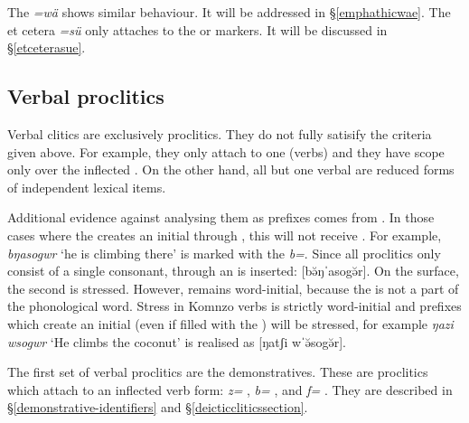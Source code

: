 The   \emph{=wä} shows similar behaviour. It will be addressed in \S{}\ref{emphathicwae}. The et cetera  \emph{=sü} only attaches to the  or   markers. It will be discussed in \S{}\ref{etceterasue}.

\subsection{Verbal proclitics}\label{verbproclitics}

Verbal clitics are exclusively proclitics. They do not fully satisify the criteria given above. For example, they only attach to one  (verbs) and they have scope only over the inflected . On the other hand, all but one verbal  are reduced forms of independent lexical items.%

Additional evidence against analysing them as prefixes comes from . In those cases where the  creates an initial  through , this  will not receive . For example, \emph{bŋasogwr} `he is climbing there' is marked with the   \emph{b=}. Since all proclitics only consist of a single consonant, through  an  is inserted: [bə̆ŋˈasogə̆r]. On the surface, the second  is stressed. However,  remains word-initial, because the  is not a part of the phonological word. Stress in Komnzo verbs is strictly word-initial and prefixes which create an initial  (even if filled with the ) will be stressed, for example \emph{ŋazi wsogwr} `He climbs the coconut' is realised as [ŋatʃi wˈə̆sogə̆r].%

The first set of verbal proclitics are the  demonstratives. These are  proclitics which attach to an inflected verb form: \emph{z=} \Prox{}, \emph{b=} \Med{}, and \emph{f=} \Dist{}. They are described in \S{}\ref{demonstrative-identifiers} and \S{}\ref{deicticcliticssection}.%

